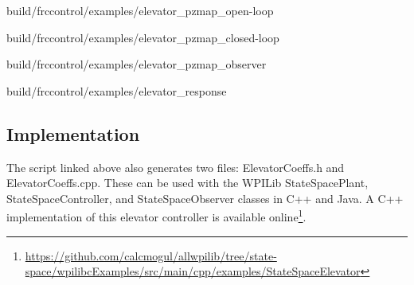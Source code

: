 \begin{bookfigure}
  \begin{minisvg}{3}{build/frccontrol/examples/elevator_pzmap_open-loop}
    \caption{Elevator open-loop pole-zero map}
    \label{fig:elevator_pzmap_open-loop}
  \end{minisvg}
  \hfill
  \begin{minisvg}{3}{build/frccontrol/examples/elevator_pzmap_closed-loop}
    \caption{Elevator closed-loop pole-zero map}
    \label{fig:elevator_pzmap_closed-loop}
  \end{minisvg}
  \hfill
  \begin{minisvg}{3}{build/frccontrol/examples/elevator_pzmap_observer}
    \caption{Elevator observer pole-zero map}
    \label{fig:elevator_pzmap_observer}
  \end{minisvg}
\end{bookfigure}

\begin{svg}{build/frccontrol/examples/elevator_response}
  \caption{Elevator response}
  \label{fig:elevator_response}
\end{svg}

\subsection{Implementation}

The script linked above also generates two files: ElevatorCoeffs.h and
ElevatorCoeffs.cpp. These can be used with the WPILib StateSpacePlant,
StateSpaceController, and StateSpaceObserver classes in C++ and Java. A C++
implementation of this elevator controller is available online\footnote{
\url{https://github.com/calcmogul/allwpilib/tree/state-space/wpilibcExamples/src/main/cpp/examples/StateSpaceElevator}}.
